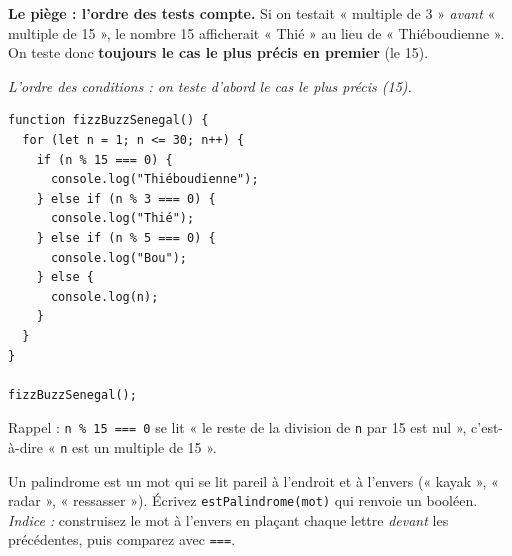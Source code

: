 \documentclass[11pt,a4paper]{article}
\newcommand{\code}[1]{\texttt{#1}}
\begin{document}
\textbf{Le piège : l'ordre des tests compte.} Si on testait « multiple de 3 » \emph{avant} « multiple de 15 », le nombre 15 afficherait « Thié » au lieu de « Thiéboudienne ». On teste donc \textbf{toujours le cas le plus précis en premier} (le 15).

\begin{center}

\textit{L'ordre des conditions : on teste d'abord le cas le plus précis (15).}
\end{center}

\begin{lstlisting}[style=js]
function fizzBuzzSenegal() {
  for (let n = 1; n <= 30; n++) {
    if (n % 15 === 0) {
      console.log("Thiéboudienne");
    } else if (n % 3 === 0) {
      console.log("Thié");
    } else if (n % 5 === 0) {
      console.log("Bou");
    } else {
      console.log(n);
    }
  }
}

fizzBuzzSenegal();
\end{lstlisting}

Rappel : \code{n \% 15 === 0} se lit « le reste de la division de \code{n} par 15 est nul », c'est-à-dire « \code{n} est un multiple de 15 ».

\begin{objectifbox}
Un palindrome est un mot qui se lit pareil à l'endroit et à l'envers (« kayak », « radar », « ressasser »). Écrivez \code{estPalindrome(mot)} qui renvoie un booléen.\\
\emph{Indice :} construisez le mot à l'envers en plaçant chaque lettre \emph{devant} les précédentes, puis comparez avec \code{===}.
\end{objectifbox}
\end{document}
